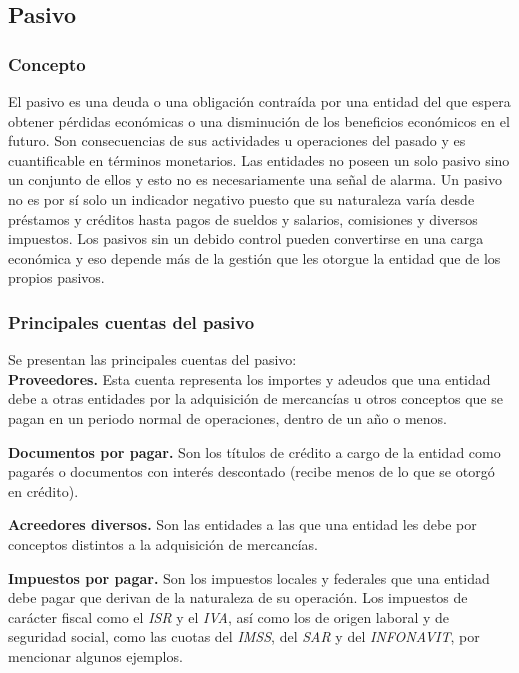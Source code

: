 \documentclass[12pt]{article}
\begin{document}
	\subsection{Pasivo}

		\subsubsection{Concepto}

		El pasivo es una deuda o una obligación contraída por una entidad del que espera obtener pérdidas económicas o una disminución de los beneficios económicos en el futuro. Son consecuencias de sus actividades u operaciones del pasado y es cuantificable en términos monetarios. Las entidades no poseen un solo pasivo sino un conjunto de ellos y esto no es necesariamente una señal de alarma. Un pasivo no es por sí solo un indicador negativo puesto que su naturaleza varía desde préstamos y créditos hasta pagos de sueldos y salarios, comisiones y diversos impuestos. Los pasivos sin un debido control pueden convertirse en una carga económica y eso depende más de la gestión que les otorgue la entidad que de los propios pasivos.
			
		\subsubsection{Principales cuentas del pasivo}

			Se presentan las principales cuentas del pasivo: \\
			
			\textbf{Proveedores.} Esta cuenta representa los importes y adeudos que una entidad debe a otras entidades por la adquisición de mercancías u otros conceptos que se pagan en un periodo normal de operaciones, dentro de un año o menos.

			\textbf{Documentos por pagar.} Son los títulos de crédito a cargo de la entidad como pagarés o documentos con interés descontado (recibe menos de lo que se otorgó en crédito).

			\textbf{Acreedores diversos.} Son las entidades a las que una entidad les debe por conceptos distintos a la adquisición de mercancías.

			\textbf{Impuestos por pagar.} Son los impuestos locales y federales que una entidad debe pagar que derivan de la naturaleza de su operación. Los impuestos de carácter fiscal como el \emph{ISR} y el \emph{IVA}, así como los de origen laboral y de seguridad social, como las cuotas del \emph{IMSS}, del \emph{SAR} y del \emph{INFONAVIT}, por mencionar algunos ejemplos.
\end{document}
